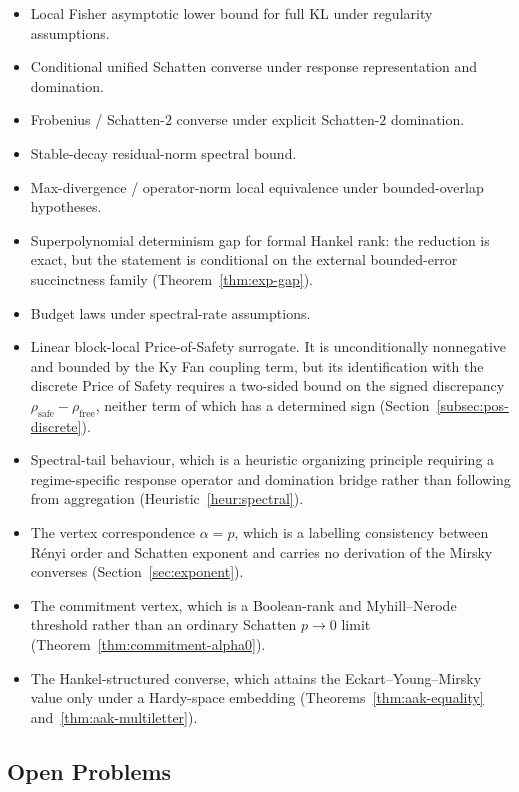 \documentclass[12pt]{article}
\theoremstyle{definition}
\begin{document}
\begin{itemize}[leftmargin=1.6em]
\item Local Fisher asymptotic lower bound for full KL under regularity
assumptions.
\item Conditional unified Schatten converse under response representation and
domination.
\item Frobenius / Schatten-$2$ converse under explicit Schatten-$2$
domination.
\item Stable-decay residual-norm spectral bound.
\item Max-divergence / operator-norm local equivalence under bounded-overlap
hypotheses.
\item Superpolynomial determinism gap for formal Hankel rank: the reduction is
exact, but the statement is conditional on the external bounded-error
succinctness family (Theorem~\ref{thm:exp-gap}).
\item Budget laws under spectral-rate assumptions.
\item Linear block-local Price-of-Safety surrogate.  It is unconditionally
nonnegative and bounded by the Ky Fan coupling term, but its identification
with the discrete Price of Safety requires a two-sided bound on the signed
discrepancy $\rho_{\mathrm{safe}}-\rho_{\mathrm{free}}$, neither term of which
has a determined sign (Section~\ref{subsec:pos-discrete}).
\item Spectral-tail behaviour, which is a heuristic organizing principle
requiring a regime-specific response operator and domination bridge rather
than following from aggregation
(Heuristic~\ref{heur:spectral}).
\item The vertex correspondence $\alpha=p$, which is a labelling consistency
between R\'enyi order and Schatten exponent and carries no derivation of the
Mirsky converses (Section~\ref{sec:exponent}).
\item The commitment vertex, which is a Boolean-rank and Myhill--Nerode
threshold rather than an ordinary Schatten $p\to0$ limit
(Theorem~\ref{thm:commitment-alpha0}).
\item The Hankel-structured converse, which attains the Eckart--Young--Mirsky
value only under a Hardy-space embedding
(Theorems~\ref{thm:aak-equality} and~\ref{thm:aak-multiletter}).
\end{itemize}

\subsection{Open Problems}
\label{sec:openproblems}
\label{subsec:open-problems}
\end{document}
